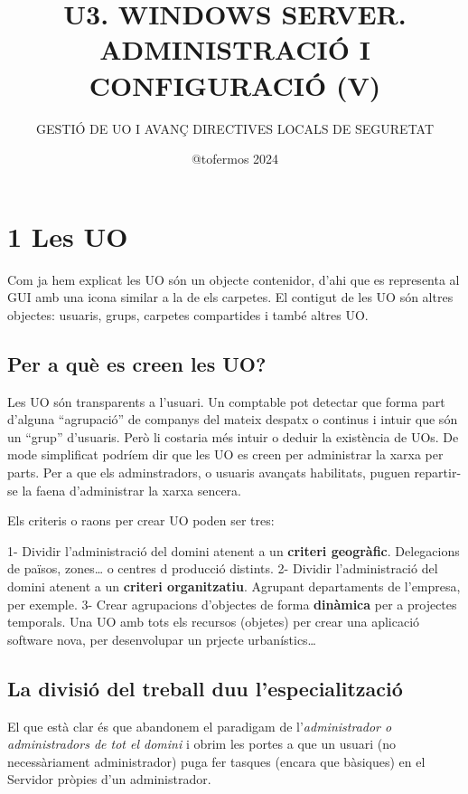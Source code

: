 \documentclass[
  a4paper,
]{article}
\title{U3. WINDOWS SERVER. ADMINISTRACIÓ I CONFIGURACIÓ (V)}
\subtitle{GESTIÓ DE UO I AVANÇ DIRECTIVES LOCALS DE SEGURETAT}
\author{@tofermos 2024}
\date{}
\begin{document}
\maketitle

{
\setcounter{tocdepth}{2}
\tableofcontents
}
\renewcommand\tablename{Tabla}
\newpage

\section{1 Les UO}\label{les-uo}

Com ja hem explicat les UO són un objecte contenidor, d'ahi que es
representa al GUI amb una icona similar a la de els carpetes. El
contigut de les UO són altres objectes: usuaris, grups, carpetes
compartides i també altres UO.

\subsection{Per a què es creen les
UO?}\label{per-a-quuxe8-es-creen-les-uo}

Les UO són transparents a l'usuari. Un comptable pot detectar que forma
part d'alguna ``agrupació'' de companys del mateix despatx o continus i
intuir que són un ``grup'' d'usuaris. Però li costaria més intuir o
deduir la existència de UOs. De mode simplificat podríem dir que les UO
es creen per administrar la xarxa per parts. Per a que els
adminstradors, o usuaris avançats habilitats, puguen repartir-se la
faena d'administrar la xarxa sencera.

Els criteris o raons per crear UO poden ser tres:

1- Dividir l'administració del domini atenent a un \textbf{criteri
geogràfic}. Delegacions de països, zones\ldots{} o centres d producció
distints. 2- Dividir l'administració del domini atenent a un
\textbf{criteri organitzatiu}. Agrupant departaments de l'empresa, per
exemple. 3- Crear agrupacions d'objectes de forma \textbf{dinàmica} per
a projectes temporals. Una UO amb tots els recursos (objetes) per crear
una aplicació software nova, per desenvolupar un prjecte
urbanístics\ldots{}

\subsection{La divisió del treball duu
l'especialització}\label{la-divisiuxf3-del-treball-duu-lespecialitzaciuxf3}

El que està clar és que abandonem el paradigam de l'\emph{administrador
o administradors de tot el domini} i obrim les portes a que un usuari
(no necessàriament administrador) puga fer tasques (encara que bàsiques)
en el Servidor pròpies d'un administrador.
\end{document}
